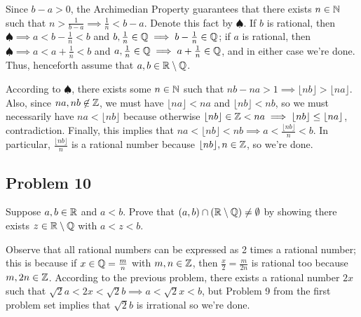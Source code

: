 \documentclass[main.tex]{subfiles}
\begin{document}
\begin{soln}
    Since $b - a > 0$, the Archimedian Property guarantees that there exists $n\in \mathbb N$ such that $n > \frac{1}{b - a}\implies \frac{1}{n} < b - a$. Denote this fact by $\spadesuit$. If $b$ is rational, then $\spadesuit \implies a < b - \frac{1}{n} < b$ and $b, \frac{1}{n}\in \mathbb Q\implies b - \frac{1}{n}\in \mathbb Q$; if $a$ is rational, then $\spadesuit \implies a < a + \frac{1}{n} < b$ and $a, \frac{1}{n}\in \mathbb Q\implies a + \frac{1}{n}\in \mathbb Q$, and in either case we're done. Thus, henceforth assume that $a, b\in \mathbb R\setminus \mathbb Q$.
    
    According to $\spadesuit$, there exists some $n\in \mathbb N$ such that $nb - na > 1\implies \lfloor nb\rfloor > \lfloor na\rfloor$. Also, since $na, nb\not\in \mathbb Z$, we must have $\lfloor na \rfloor < na$ and $\lfloor nb \rfloor < nb$, so we must necessarily have $na < \lfloor nb\rfloor$ because otherwise $\lfloor nb\rfloor \in\mathbb Z < na\implies \lfloor nb\rfloor \le \lfloor na\rfloor$, contradiction. Finally, this implies that $na < \lfloor nb \rfloor < nb\implies a < \frac{\lfloor nb \rfloor}{n} < b$. In particular, $\frac{\lfloor nb \rfloor}{n}$ is a rational number because $\lfloor nb\rfloor , n \in \mathbb Z$, so we're done.
\end{soln}
\eject

\subsection{Problem 10}
\begin{claim}
    Suppose $a, b \in \mathbb R$ and $a < b$. Prove that $(a,b) \cap (\mathbb R \setminus \mathbb Q) \neq \emptyset$ by showing there exists $z \in \mathbb R \setminus \mathbb Q$ with $a < z < b$.
\end{claim}

\begin{soln}
    Observe that all rational numbers can be expressed as 2 times a rational number; this is because if $x \in \mathbb Q = \frac{m}{n}$ with $m, n\in \mathbb Z$, then $\frac{x}{2} = \frac{m}{2n}$ is rational too because $m, 2n\in \mathbb Z$. According to the previous problem, there exists a rational number $2x$ such that $\sqrt{2}a < 2x < \sqrt{2}b\implies a < \sqrt{2}x < b$, but Problem 9 from the first problem set implies that $\sqrt{2}b$ is irrational so we're done. 
\end{soln}
\eject
\end{document}
